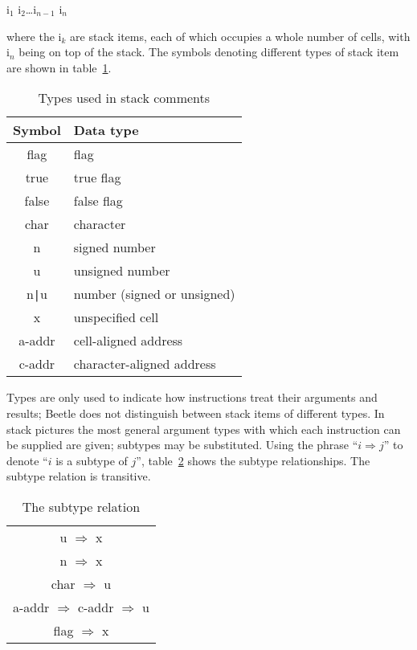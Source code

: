 \documentclass[english]{article}
\newcommand{\spic}[1]{{\spfont\setlength{\baselineskip}{\normalbaselineskip}#1\/}}
\begin{document}
\centerline{\spic{i$_1$ i$_2$\dots i$_{n-1}$ i$_n$}}

where the \spic{i$_k$} are stack items, each of which occupies a whole number of
cells, with \spic{i$_n$} being on top of the stack. The symbols denoting
different types of stack item are shown in table~\ref{typetable}.

\begin{table}[htbp]
\begin{center}
\begin{tabular}{cl} \toprule
\bf Symbol & \bf Data type \\ \midrule
\spic{flag} & flag \\
\spic{true} & true flag \\
\spic{false} & false flag \\
\spic{char} & character \\
\spic{n} & signed number \\
\spic{u} & unsigned number \\
\spic{n{\tt |}u} & number (signed or unsigned) \\
\spic{x} & unspecified cell \\
\spic{a-addr} & cell-aligned address \\
\spic{c-addr} & character-aligned address \\ \bottomrule
\end{tabular}
\caption{\label{typetable}Types used in stack comments}
\end{center}
\end{table}

Types are only used to indicate how instructions treat their arguments and
results; Beetle does not distinguish between stack items of different types. In
stack pictures the most general argument types with which each instruction can
be supplied are given; subtypes may be substituted. Using the phrase ``$i
\Rightarrow j$'' to denote ``$i$\/ is a subtype of $j$\/'', table~\ref{reltable}
shows the subtype relationships. The subtype relation is transitive.

\begin{table}[htbp]
\begin{center}
\begin{tabular}{c} \toprule
\spic{u} $\Rightarrow$ \spic{x} \\
\spic{n} $\Rightarrow$ \spic{x} \\
\spic{char} $\Rightarrow$ \spic{u} \\
\spic{a-addr} $\Rightarrow$ \spic{c-addr} $\Rightarrow$ \spic{u} \\
\spic{flag} $\Rightarrow$ \spic{x} \\ \bottomrule
\end{tabular}
\caption{\label{reltable}The subtype relation}
\end{center}
\end{table}
\end{document}
